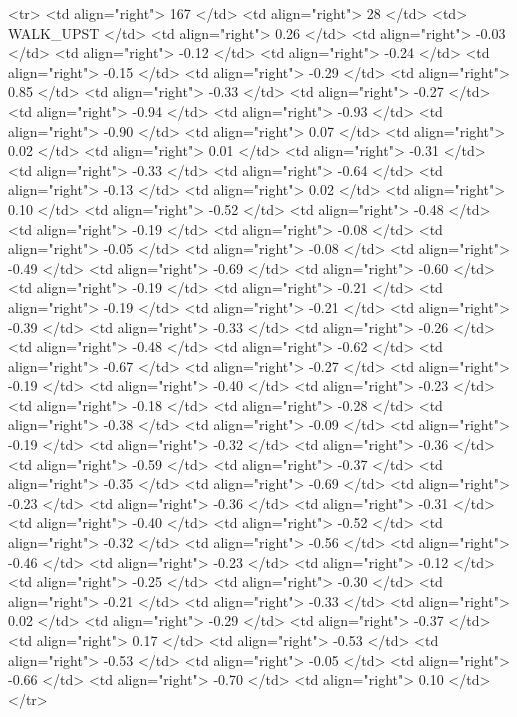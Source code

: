   <tr> <td align="right"> 167 </td> <td align="right">  28 </td> <td> WALK_UPST </td> <td align="right"> 0.26 </td> <td align="right"> -0.03 </td> <td align="right"> -0.12 </td> <td align="right"> -0.24 </td> <td align="right"> -0.15 </td> <td align="right"> -0.29 </td> <td align="right"> 0.85 </td> <td align="right"> -0.33 </td> <td align="right"> -0.27 </td> <td align="right"> -0.94 </td> <td align="right"> -0.93 </td> <td align="right"> -0.90 </td> <td align="right"> 0.07 </td> <td align="right"> 0.02 </td> <td align="right"> 0.01 </td> <td align="right"> -0.31 </td> <td align="right"> -0.33 </td> <td align="right"> -0.64 </td> <td align="right"> -0.13 </td> <td align="right"> 0.02 </td> <td align="right"> 0.10 </td> <td align="right"> -0.52 </td> <td align="right"> -0.48 </td> <td align="right"> -0.19 </td> <td align="right"> -0.08 </td> <td align="right"> -0.05 </td> <td align="right"> -0.08 </td> <td align="right"> -0.49 </td> <td align="right"> -0.69 </td> <td align="right"> -0.60 </td> <td align="right"> -0.19 </td> <td align="right"> -0.21 </td> <td align="right"> -0.19 </td> <td align="right"> -0.21 </td> <td align="right"> -0.39 </td> <td align="right"> -0.33 </td> <td align="right"> -0.26 </td> <td align="right"> -0.48 </td> <td align="right"> -0.62 </td> <td align="right"> -0.67 </td> <td align="right"> -0.27 </td> <td align="right"> -0.19 </td> <td align="right"> -0.40 </td> <td align="right"> -0.23 </td> <td align="right"> -0.18 </td> <td align="right"> -0.28 </td> <td align="right"> -0.38 </td> <td align="right"> -0.09 </td> <td align="right"> -0.19 </td> <td align="right"> -0.32 </td> <td align="right"> -0.36 </td> <td align="right"> -0.59 </td> <td align="right"> -0.37 </td> <td align="right"> -0.35 </td> <td align="right"> -0.69 </td> <td align="right"> -0.23 </td> <td align="right"> -0.36 </td> <td align="right"> -0.31 </td> <td align="right"> -0.40 </td> <td align="right"> -0.52 </td> <td align="right"> -0.32 </td> <td align="right"> -0.56 </td> <td align="right"> -0.46 </td> <td align="right"> -0.23 </td> <td align="right"> -0.12 </td> <td align="right"> -0.25 </td> <td align="right"> -0.30 </td> <td align="right"> -0.21 </td> <td align="right"> -0.33 </td> <td align="right"> 0.02 </td> <td align="right"> -0.29 </td> <td align="right"> -0.37 </td> <td align="right"> 0.17 </td> <td align="right"> -0.53 </td> <td align="right"> -0.53 </td> <td align="right"> -0.05 </td> <td align="right"> -0.66 </td> <td align="right"> -0.70 </td> <td align="right"> 0.10 </td> </tr>
